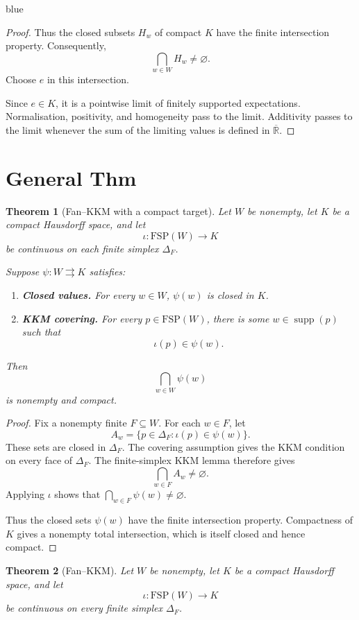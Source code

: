 \documentclass[11pt]{article}
\newtheorem{theorem}{Theorem}[section]
\theoremstyle{definition}
\theoremstyle{remark}
\newcommand{\supp}{\operatorname{supp}}
\newenvironment{AIwritten}{\begin{color}{blue}}{\end{color}}
\begin{document}
\begin{AIwritten}
\begin{proof}
	Thus the closed subsets $H_w$ of compact $K$
	have the finite intersection property.
	Consequently,
	\[
	\bigcap_{w\in W}H_w\ne\varnothing.
	\]
	Choose $e$ in this intersection.
	
	Since $e\in K$, it is a pointwise limit of
	finitely supported expectations.
	Normalisation, positivity, and homogeneity
	pass to the limit. Additivity passes to the
	limit whenever the sum of the limiting values
	is defined in $\overline{\mathbb R}$.
\end{proof}


\section{General Thm}
\begin{theorem}[Fan--KKM with a compact target]
	Let $W$ be nonempty, let $K$ be a compact Hausdorff
	space, and let
	\[
	\iota:\mathrm{FSP}(W)\to K
	\]
	be continuous on each finite simplex $\Delta_F$.
	
	Suppose $\psi:W\rightrightarrows K$ satisfies:
	\begin{enumerate}
		\item \textbf{Closed values.}
		For every $w\in W$, $\psi(w)$ is closed in $K$.
		
		\item \textbf{KKM covering.}
		For every $p\in\mathrm{FSP}(W)$, there is
		some $w\in\supp(p)$ such that
		\[
		\iota(p)\in\psi(w).
		\]
	\end{enumerate}
	Then
	\[
	\bigcap_{w\in W}\psi(w)
	\]
	is nonempty and compact.
\end{theorem}

\begin{proof}
	Fix a nonempty finite $F\subseteq W$.
	For each $w\in F$, let
	\[
	A_w=\{p\in\Delta_F:\iota(p)\in\psi(w)\}.
	\]
	These sets are closed in $\Delta_F$.
	The covering assumption gives the KKM condition
	on every face of $\Delta_F$.
	The finite-simplex KKM lemma therefore gives
	\[
	\bigcap_{w\in F}A_w\ne\varnothing.
	\]
	Applying $\iota$ shows that
	$\bigcap_{w\in F}\psi(w)\ne\varnothing$.
	
	Thus the closed sets $\psi(w)$ have the finite
	intersection property. Compactness of $K$ gives
	a nonempty total intersection, which is itself
	closed and hence compact.
\end{proof}


\begin{theorem}[Fan--KKM]\label{thm:KKM}
	Let $W$ be nonempty, let $K$ be a compact Hausdorff
	space, and let
	\[
	\iota:\mathrm{FSP}(W)\to K
	\]
	be continuous on every finite simplex $\Delta_F$.
	

\end{theorem}
\end{AIwritten}
\end{document}
